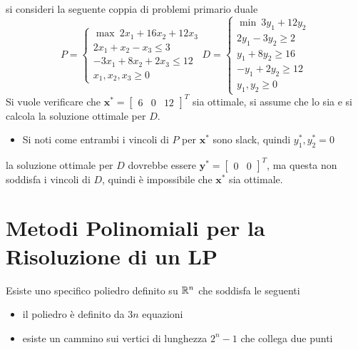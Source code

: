 \documentclass[10pt, letterpaper]{report}
\newcommand{\x}{{\mathbf{x}}}
\newcommand{\y}{{\mathbf{y}}}
\begin{document}
si consideri la seguente coppia di problemi primario duale\begin{equation}
    P=\begin{cases}
        \max \ 2x_1+16x_2+12x_3 \\ 
        2x_1+x_2-x_3\le 3\\ 
        -3x_1+8x_2+2x_3\le 12 \\ 
        x_1,x_2,x_3\ge 0
    \end{cases}
    D=\begin{cases}
        \min \ 3y_1+12y_2\\ 
        2y_1-3y_2\ge 2 \\ 
        y_1+8y_2\ge 16\\ 
        -y_1+2y_2\ge 12 \\ 
        y_1,y_2\ge 0
    \end{cases}
\end{equation}
Si vuole verificare che $\x^*=\begin{bmatrix}
    6&0&12
\end{bmatrix}^T$ sia ottimale, si assume che lo sia e si calcola la soluzione ottimale per $D$.\begin{itemize}
    \item Si noti come entrambi i vincoli di $P$ per $\x^*$ sono slack, quindi $y^*_1,y_2^*=0$
\end{itemize}
la soluzione ottimale per $D$ dovrebbe essere $\y^*=\begin{bmatrix}
    0&0
\end{bmatrix}^T$, ma questa non soddisfa i vincoli di $D$, quindi è impossibile che $\x^*$ sia ottimale.

\chapter{Metodi Polinomiali per la Risoluzione di un LP}
Esiste uno specifico poliedro definito su ${\mathbb R}^n$ che soddisfa le seguenti \begin{itemize}
    \item il poliedro è definito da $3n$ equazioni 
    \item esiste un cammino sui vertici di lunghezza $2^n-1$ che collega due punti
\end{itemize}
\begin{figure}[h]
\end{figure}
\end{document}
